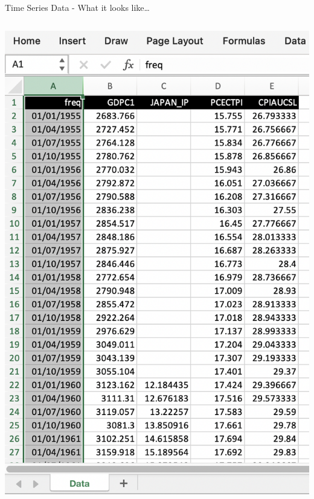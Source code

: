 \documentclass[
  10pt,
  ignorenonframetext,
]{beamer}
\begin{document}
\begin{frame}{Time Series Data - What it looks like\ldots{}}
\begin{columns}[T]
\begin{column}{0.48\textwidth}
\begin{flushright}\includegraphics[width=0.9\linewidth]{pictures/TimeSeries-Example} \end{flushright}
\end{column}
\end{columns}
\end{frame}
\end{document}
